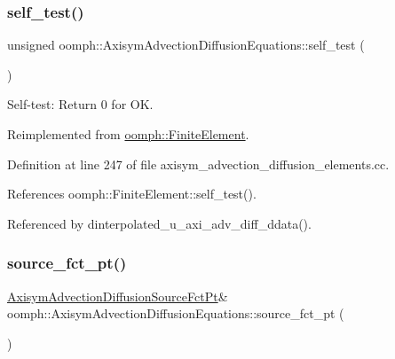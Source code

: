 \mbox{\label{classoomph_1_1AxisymAdvectionDiffusionEquations_a43146d9ddd728dd85340629acb726183}} 
\subsubsection{\texorpdfstring{self\+\_\+test()}{self\_test()}}
{\footnotesize\ttfamily unsigned oomph\+::\+Axisym\+Advection\+Diffusion\+Equations\+::self\+\_\+test (\begin{DoxyParamCaption}{ }\end{DoxyParamCaption})\hspace{0.3cm}{\ttfamily [virtual]}}



Self-\/test\+: Return 0 for OK. 



Reimplemented from \hyperlink{classoomph_1_1FiniteElement_af94c5a5e22175d5420b33b3b79e46ed3}{oomph\+::\+Finite\+Element}.



Definition at line 247 of file axisym\+\_\+advection\+\_\+diffusion\+\_\+elements.\+cc.



References oomph\+::\+Finite\+Element\+::self\+\_\+test().



Referenced by dinterpolated\+\_\+u\+\_\+axi\+\_\+adv\+\_\+diff\+\_\+ddata().

\mbox{\label{classoomph_1_1AxisymAdvectionDiffusionEquations_abfa1361d267d17ee38baa667f00b9553}} 
\subsubsection{\texorpdfstring{source\+\_\+fct\+\_\+pt()}{source\_fct\_pt()}\hspace{0.1cm}{\footnotesize\ttfamily [1/2]}}
{\footnotesize\ttfamily \hyperlink{classoomph_1_1AxisymAdvectionDiffusionEquations_a5110527308cbe58e90fb9ac146d172a0}{Axisym\+Advection\+Diffusion\+Source\+Fct\+Pt}\& oomph\+::\+Axisym\+Advection\+Diffusion\+Equations\+::source\+\_\+fct\+\_\+pt (\begin{DoxyParamCaption}{ }\end{DoxyParamCaption})\hspace{0.3cm}{\ttfamily [inline]}}



